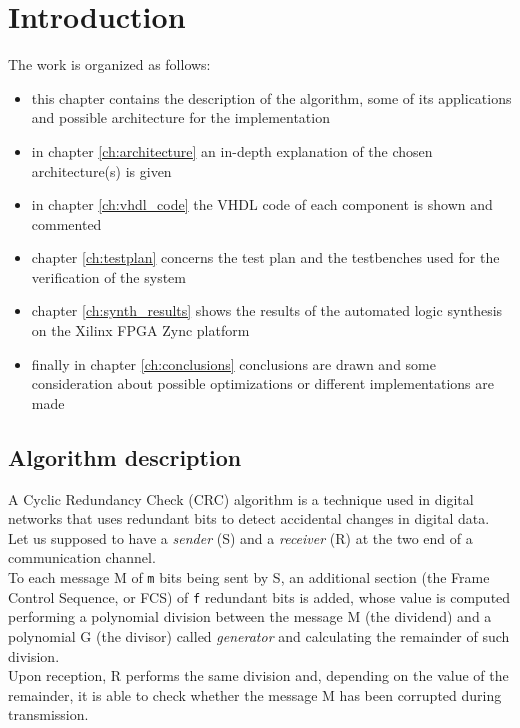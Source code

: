 %
\chapter{Introduction}\label{ch:introduction}
The work is organized as follows:
\begin{itemize}
	\item this chapter contains the description of the algorithm, some of its applications and possible architecture for the implementation
	\item in chapter \ref{ch:architecture} an in-depth explanation of the chosen architecture(s) is given
	\item in chapter \ref{ch:vhdl_code} the VHDL code of each component is shown and commented
	\item chapter \ref{ch:testplan} concerns the test plan and the testbenches used for the verification of the system
	\item chapter \ref{ch:synth_results} shows the results of the automated logic synthesis on the Xilinx FPGA Zync platform
	\item finally in chapter \ref{ch:conclusions} conclusions are drawn and some consideration about possible optimizations or different implementations are made
\end{itemize}

\section{Algorithm description}\label{sec:alg_description}
A Cyclic Redundancy Check (CRC) algorithm is a technique used in digital networks that uses redundant bits to detect accidental changes in digital data.\\
Let us supposed to have a \textit{sender} (S) and a \textit{receiver} (R) at the two end of a communication channel.\\
To each message M of \texttt{m} bits being sent by S, an additional section (the Frame Control Sequence, or FCS) of \texttt{f} redundant bits is added, whose value is computed performing a polynomial division between the message M (the dividend) and a polynomial G (the divisor) called \textit{generator} and calculating the remainder of such division.\\
Upon reception, R performs the same division and, depending on the value of the remainder, it is able to check whether the message M has been corrupted during transmission.\\

